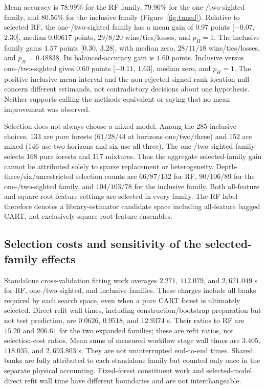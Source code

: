 Mean accuracy is $78.99\%$ for the RF family, $79.96\%$ for the
one-/two-sighted family, and $80.56\%$ for the inclusive family
(Figure~\ref{fig:tuned}). Relative to selected RF, the one-/two-sighted
family has a mean gain of $0.97$ points [$-0.07$, $2.30$], median
$0.00617$ points, $29/8/20$ wins/ties/losses, and $p_H=1$.
The inclusive family gains $1.57$ points [$0.30$, $3.28$], with
median zero, $28/11/18$ wins/ties/losses, and $p_H=0.48838$.
Its balanced-accuracy gain is $1.60$ points. Inclusive versus
one-/two-sighted gives $0.60$ points [$-0.11$, $1.63$], median
zero, and $p_H=1$. The positive inclusive mean interval and the
non-rejected signed-rank location null concern different estimands,
not contradictory decisions about one hypothesis. Neither supports
calling the methods equivalent or saying that no mean improvement
was observed.

Selection does not always choose a mixed model. Among the 285
inclusive choices, 133 are pure forests ($61/28/44$ at horizons
one/two/three) and 152 are mixed (146 use two horizons and six use all three).
The one-/two-sighted family selects 168 pure forests and 117
mixtures. Thus the aggregate selected-family gain cannot be
attributed solely to sparse replacement or heterogeneity.
Depth-three/six/unrestricted selection counts are $66/87/132$ for RF,
$90/106/89$ for the one-/two-sighted family, and $104/103/78$ for
the inclusive family. Both all-feature and square-root-feature
settings are selected in every family. The RF label therefore
denotes a library-estimator candidate space including all-feature
bagged CART, not exclusively square-root-feature ensembles.

\subsection{Selection costs and sensitivity of the selected-family effects}
Standalone cross-validation fitting work averages $2.271$, $112.079$,
and $2,671.049$ s for RF, one-/two-sighted, and inclusive families.
These charges include all banks required by each search space,
even when a pure CART forest is ultimately selected. Direct refit
wall times, including construction/bootstrap preparation but not
test prediction, are $0.0626$, $0.9518$, and $12.9374$ s. Their
ratios to RF are $15.20$ and $206.61$ for the two expanded families;
these are refit ratios, not selection-cost ratios. Mean sums of
measured workflow stage wall times are $3.405$, $118.035$, and
$2,693.803$ s. They are not uninterrupted end-to-end times.
Shared banks are fully attributed to each standalone family but
counted only once in the separate physical accounting. Fixed-forest
constituent work and selected-model direct refit wall time have
different boundaries and are not interchangeable.

